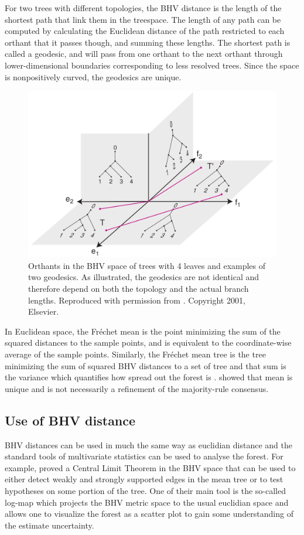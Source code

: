 For two trees with different topologies, the BHV distance is the length of the shortest path that link them in the treespace. The length of any path can be computed by calculating the Euclidean distance of the path restricted to each orthant that it passes though, and summing these lengths. The shortest path is called a geodesic, and will pass from one orthant to the next orthant through lower-dimensional boundaries corresponding to less resolved trees. Since the space is nonpositively  curved, the geodesics are unique.

\begin{figure}
\centering
 \includegraphics[width = 0.5\linewidth]{Figs/OrthantBHV-bis}
 \caption{Orthants in the BHV space of trees with 4 leaves and examples of two 
geodesics. As illustrated, the geodesics are not identical and therefore depend 
on both the topology and the actual branch lengths. Reproduced with 
permission from \citet{Billera2001}. Copyright 2001, Elsevier.}
\end{figure}

In Euclidean space, the Fr\'echet mean is the point minimizing the sum of the squared distances to the sample points, and is equivalent to the coordinate-wise average of the sample points. Similarly, the Fr\'echet mean tree is the tree minimizing the sum of squared BHV distances to a set of tree and that sum is the variance which quantifies how spread out the forest is \citep{miller2015polyhedral,brown2017mean}. \citet{Billera2001} showed that mean is unique and is not necessarily a refinement of the majority-rule consensus.

\subsection{Use of BHV distance} \label{sec:means-and-variance}

BHV distances can be used in much the same way as euclidian distance and the standard tools of multivariate statistics can be used  to analyse the forest. For example, \citet{barden2014limiting} proved a Central Limit Theorem in the BHV space that can be used to either detect weakly and strongly supported edges in the mean tree or to test hypotheses on some portion of the tree. One of their main tool is the so-called log-map which projects the BHV metric space to the usual euclidian space and allows one to visualize the forest as a scatter plot to gain some understanding of the estimate uncertainty.

